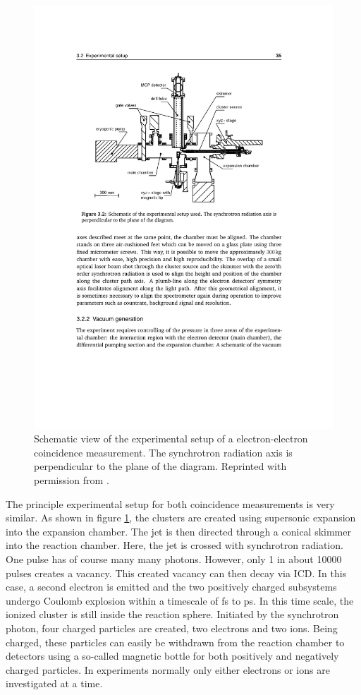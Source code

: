 \begin{figure}[h]
  \centering
  \includegraphics[]{pics/exp_setup_overview.pdf}
  \caption{Schematic view of the experimental setup of a electron-electron
           coincidence measurement. The synchrotron radiation axis
           is perpendicular to the plane of the diagram.
           Reprinted with permission from \cite{PhDFoerstel}. }
  \label{figure:exp_setup_overview}
\end{figure}

The principle experimental setup for both coincidence measurements is very similar.
As shown in figure \ref{figure:exp_setup_overview},
the clusters are created using supersonic expansion into
the expansion chamber. The jet is then directed through a conical skimmer
into the reaction chamber. Here, 
the jet is crossed with synchrotron radiation.
One pulse has of course many many photons. However, only 1 in about 10000
pulses creates a vacancy.
This created vacancy can then decay via ICD.
In this case, a second electron is emitted and the two positively charged
subsystems undergo
Coulomb explosion within a timescale of \unit{fs} to \unit[]{ps}.
In this time scale, the ionized cluster is still inside the reaction sphere.
Initiated by the synchrotron photon, four charged particles are created,
two electrons and two ions.
Being charged, these particles can easily be withdrawn from the reaction
chamber to detectors using a so-called magnetic bottle for both positively
and negatively charged particles. In experiments normally only either electrons
or ions are investigated at a time.


